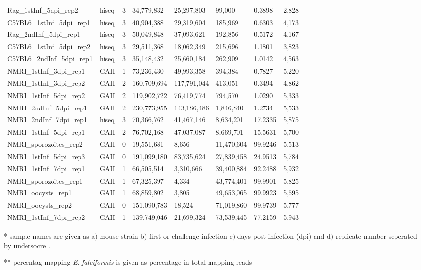 \documentclass{bmcart}
\begin{document}
\begin{backmatter}
\begin{table}[ht]
\begin{tabular}{lllllllll}
  Rag\_1stInf\_5dpi\_rep2 & hiseq & 3 & 34,779,832 & 25,297,803 & 99,000 & 0.3898 & 2,828 \\ 
  C57BL6\_1stInf\_5dpi\_rep1 & hiseq & 3 & 40,904,388 & 29,319,604 & 185,969 & 0.6303 & 4,173 \\ 
  Rag\_2ndInf\_5dpi\_rep1 & hiseq & 3 & 50,049,848 & 37,093,621 & 192,856 & 0.5172 & 4,167 \\ 
  C57BL6\_1stInf\_5dpi\_rep2 & hiseq & 3 & 29,511,368 & 18,062,349 & 215,696 & 1.1801 & 3,823 \\ 
  C57BL6\_2ndInf\_5dpi\_rep1 & hiseq & 3 & 35,148,432 & 25,660,184 & 262,909 & 1.0142 & 4,563 \\ 
  NMRI\_1stInf\_3dpi\_rep1 & GAII & 1 & 73,236,430 & 49,993,358 & 394,384 & 0.7827 & 5,220 \\ 
  NMRI\_1stInf\_3dpi\_rep2 & GAII & 2 & 160,709,694 & 117,791,044 & 413,051 & 0.3494 & 4,862 \\ 
  NMRI\_1stInf\_5dpi\_rep2 & GAII & 2 & 119,902,722 & 76,419,774 & 794,570 & 1.0290 & 5,333 \\ 
  NMRI\_2ndInf\_5dpi\_rep1 & GAII & 2 & 230,773,955 & 143,186,486 & 1,846,840 & 1.2734 & 5,533 \\ 
  NMRI\_2ndInf\_7dpi\_rep1 & hiseq & 3 & 70,366,762 & 41,467,146 & 8,634,201 & 17.2335 & 5,875 \\ 
  NMRI\_1stInf\_5dpi\_rep1 & GAII & 2 & 76,702,168 & 47,037,087 & 8,669,701 & 15.5631 & 5,700 \\ 
  NMRI\_sporozoites\_rep2 & GAII & 0 & 19,551,681 & 8,656 & 11,470,604 & 99.9246 & 5,513 \\ 
  NMRI\_1stInf\_5dpi\_rep3 & GAII & 0 & 191,099,180 & 83,735,624 & 27,839,458 & 24.9513 & 5,784 \\ 
  NMRI\_1stInf\_7dpi\_rep1 & GAII & 1 & 66,505,514 & 3,310,666 & 39,400,884 & 92.2488 & 5,932 \\ 
  NMRI\_sporozoites\_rep1 & GAII & 1 & 67,325,397 & 4,334 & 43,774,401 & 99.9901 & 5,825 \\ 
  NMRI\_oocysts\_rep1 & GAII & 1 & 68,859,802 & 3,805 & 49,653,065 & 99.9923 & 5,695 \\ 
  NMRI\_oocysts\_rep2 & GAII & 0 & 151,090,783 & 18,524 & 71,019,860 & 99.9739 & 5,777 \\ 
  NMRI\_1stInf\_7dpi\_rep2 & GAII & 1 & 139,749,046 & 21,699,324 & 73,539,445 & 77.2159 & 5,943 \\ 
   \hline
\end{tabular}
\begin{tablenotes}[flushleft]\footnotesize\singlespacing
\item{*} sample names are given as a$)$ mouse strain b$)$ first or challenge
  infection c$)$ days post infection (dpi) and d$)$ replicate number
  seperated by undersocre . \\
\item{**} percentag mapping \textit{E. falciformis} is given as percentage in total mapping reads
\end{tablenotes}
\end{table}
\hspace*{+2.5cm}






\end{backmatter}
\end{document}
